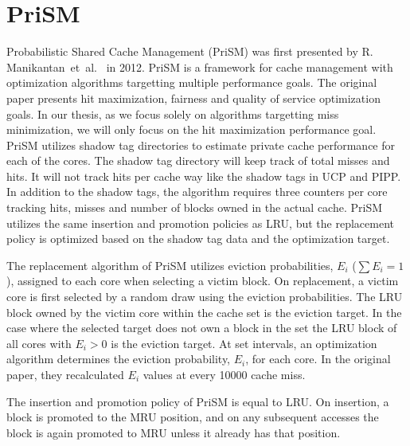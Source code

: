 \section{PriSM}
\label{sec:background:algorithms:prism}

Probabilistic Shared Cache Management (PriSM) was first presented by R. Manikantan~et~al.~\cite{Manikantan2012} in 2012.
PriSM is a framework for cache management with optimization algorithms targetting multiple performance goals.
The original paper presents hit maximization, fairness and quality of service optimization goals.
In our thesis, as we focus solely on algorithms targetting miss minimization, we will only focus on the hit maximization performance goal.
PriSM utilizes shadow tag directories to estimate private cache performance for each of the cores.
The shadow tag directory will keep track of total misses and hits.
It will not track hits per cache way like the shadow tags in UCP and PIPP.
In addition to the shadow tags, the algorithm requires three counters per core tracking hits, misses and number of blocks owned in the actual cache.
PriSM utilizes the same insertion and promotion policies as LRU, but the replacement policy is optimized based on the shadow tag data and the optimization target.

The replacement algorithm of PriSM utilizes eviction probabilities, $E_i$ ($\sum{E_i} = 1$), assigned to each core when selecting a victim block.
On replacement, a victim core is first selected by a random draw using the eviction probabilities.
The LRU block owned by the victim core within the cache set is the eviction target.
In the case where the selected target does not own a block in the set the LRU block of all cores with $E_i > 0$ is the eviction target.
At set intervals, an optimization algorithm determines the eviction probability, $E_i$, for each core.
In the original paper, they recalculated $E_i$ values at every 10000 cache miss.

The insertion and promotion policy of PriSM is equal to LRU.
On insertion, a block is promoted to the MRU position, and on any subsequent accesses the block is again promoted to MRU unless it already has that position.


